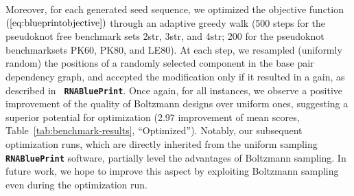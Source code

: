 \documentclass{bioinfo}
\newcommand{\RNAblueprint}{{\tt \bfseries{}\color{black!75} RNA\textcolor{blue!70!black}{Blue}Print}}
\begin{document}
Moreover, for each generated seed sequence, we optimized the objective
function $(\ref{eq:blueprintobjective})$ through an adaptive greedy
walk (500 steps for the pseudoknot free benchmark sets 2str, 3str, and
4str; 200 for the pseudoknot benchmarksets PK60, PK80, and LE80). At
each step, we resampled (uniformly random) the positions of a randomly
selected component in the base pair dependency graph, and accepted the
modification only if it resulted in a gain, as described in
\RNAblueprint{}.
%
Once again, for all instances, we observe a positive improvement of
the quality of Boltzmann designs over uniform ones, suggesting a
superior potential for optimization (2.97 improvement of mean
scores, Table~\ref{tab:benchmark-results}, ``Optimized''). Notably,
our subsequent optimization runs, which are directly inherited from
the uniform sampling \RNAblueprint{} software, partially level the
advantages of Boltzmann sampling. In future work, we hope to improve
this aspect by exploiting Boltzmann sampling even during the
optimization run.
\end{document}
